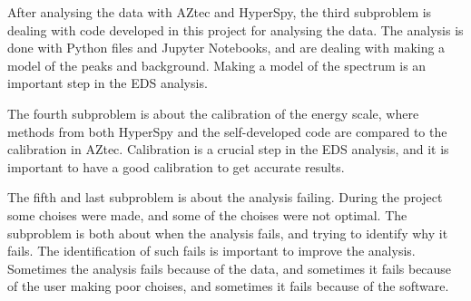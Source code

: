 After analysing the data with AZtec and HyperSpy, the third subproblem is dealing with code developed in this project for analysing the data.
The analysis is done with Python files and Jupyter Notebooks, and are dealing with making a model of the peaks and background.
Making a model of the spectrum is an important step in the EDS analysis.

\begin{center}
\end{center}




The fourth subproblem is about the calibration of the energy scale, where methods from both HyperSpy and the self-developed code are compared to the calibration in AZtec.
Calibration is a crucial step in the EDS analysis, and it is important to have a good calibration to get accurate results.

\begin{center}
\end{center}



The fifth and last subproblem is about the analysis failing.
During the project some choises were made, and some of the choises were not optimal.
The subproblem is both about when the analysis fails, and trying to identify why it fails.
The identification of such fails is important to improve the analysis.
Sometimes the analysis fails because of the data, and sometimes it fails because of the user making poor choises, and sometimes it fails because of the software.


\begin{center}
\end{center}






